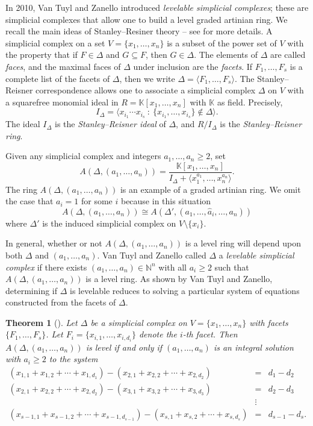 \documentclass[12pt]{amsart}
\numberwithin{equation}{section}
\newtheorem{theorem}{Theorem}[section]
\theoremstyle{definition}
\newcounter{i} %
\begin{document}
In 2010, Van Tuyl and Zanello \cite{VTZ2010} introduced {\it levelable simplicial complexes}; these are simplicial complexes
that allow one to build a level graded artinian ring.  We
recall the main ideas of Stanley--Resiner theory -- see \cite{HHgtm260} for more details.
A simplicial complex on a set $V = \{x_1,\ldots,x_n\}$ is 
a subset of the power set of $V$ with the property that
if $F \in \Delta$ and $G \subseteq F$, then $G \in \Delta$.  
The elements of $\Delta$ are called {\it faces}, and the
maximal faces of $\Delta$ under inclusion are the {\it facets}.
If $F_1,\ldots,F_s$ is a complete list of the facets of
$\Delta$, then we write $\Delta = \langle F_1,\ldots,F_s \rangle$.
The Stanley--Reisner correspondence allows one to associate
a simplicial complex $\Delta$ on $V$ with a squarefree
monomial ideal in $R =\mathbb{K}[x_1,\ldots,x_n]$ with $\mathbb{K}$
as field.  Precisely, 
\[I_\Delta = \langle x_{i_1}\cdots x_{i_s} ~:~ \{x_{i_1},\ldots,
x_{i_s}\} \not\in \Delta \rangle.\]   
The ideal $I_\Delta$ is the {\it Stanley--Reisner ideal}
of $\Delta$, and $R/I_\Delta$ is the {\it Stanley--Reisner ring}.

Given any simplicial complex and integers $a_1,\ldots,a_n \geq 2$,
set 
\[A(\Delta,(a_1,\ldots,a_n)) = \frac{\mathbb{K}[x_1,\ldots,x_n]}{I_\Delta + \langle
x_1^{a_1},\ldots,x_n^{a_n}\rangle}.\]
The ring
$A(\Delta,(a_1,\ldots,a_n))$ is an example of a 
graded artinian ring. We omit the case that
$a_i=1$ for some $i$ because in this situation
\[A(\Delta,(a_1,\ldots,a_n)) \cong A(\Delta',(a_1,\ldots,\hat{a}_i,
\ldots,a_n))\]
where $\Delta'$ is the induced simplicial complex on
$V \setminus \{x_i\}$.

In general, whether or not $A(\Delta,(a_1,\ldots,a_n))$ is
a level ring will depend upon both $\Delta$ and $(a_1,\ldots,a_n)$.
Van Tuyl and Zanello called $\Delta$ a {\it levelable simplicial
complex} if there exists  $(a_1,\ldots,a_n) \in \mathbb{N}^n$
with all $a_i \geq 2$ such that $A(\Delta,(a_1,\ldots,a_n))$
is a level ring.  As shown by Van Tuyl and Zanello,
determining if $\Delta$ is levelable reduces to solving
a particular system of equations constructed from the
facets of $\Delta$.


\begin{theorem}[{\cite[Theorem 6]{VTZ2010}}]\label{levelableclassification}
Let $\Delta$ be
a simplicial complex on $V = \{x_1,\ldots,x_n\}$ with facets $\{F_1,\ldots,F_s\}$.
Let $F_i = \{x_{i,1},\ldots,x_{i,d_i}\}$ denote the $i$-th facet.
Then $A(\Delta,(a_1,\ldots,a_n))$
is level if and only if $(a_1,\ldots,a_n)$ is an integral solution 
with $a_i \geq 2$ to the 
system
\begin{eqnarray*}
    (x_{1,1}+ x_{1,2} + \cdots + x_{1,d_1}) -
    (x_{2,1} + x_{2,2} + \cdots + x_{2,d_2}) &=& d_1 -d_2 \\
    (x_{2,1}+ x_{2,2} + \cdots + x_{2,d_2}) -
    (x_{3,1} + x_{3,2} + \cdots + x_{3,d_3}) &=& d_2 -d_3 \\
   & \vdots & \\
    (x_{s-1,1}+ x_{s-1,2} + \cdots + x_{s-1,d_{s-1}}) -
    (x_{s,1} + x_{s,2} + \cdots + x_{s,d_s}) &=& d_{s-1} -d_s. 
\end{eqnarray*}
\end{theorem}
\end{document}
